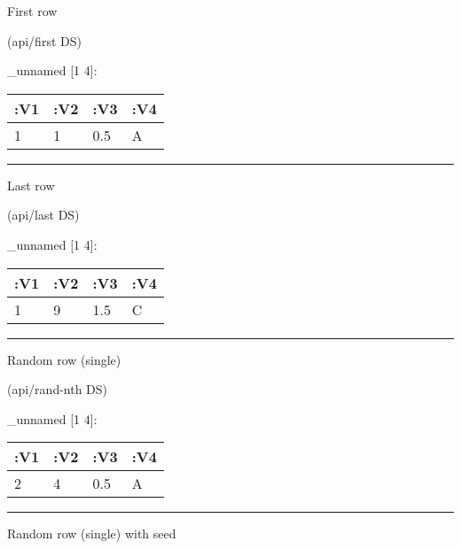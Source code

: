 \documentclass[]{article}
\newenvironment{Shaded}{\begin{snugshade}}{\end{snugshade}}
\newcommand{\NormalTok}[1]{#1}
\begin{document}
First row

\begin{Shaded}
\begin{Highlighting}[]
\NormalTok{(api/first DS)}
\end{Highlighting}
\end{Shaded}

\_unnamed {[}1 4{]}:

\begin{longtable}[]{@{}llll@{}}
\toprule
:V1 & :V2 & :V3 & :V4\tabularnewline
\midrule
\endhead
1 & 1 & 0.5 & A\tabularnewline
\bottomrule
\end{longtable}

\begin{center}\rule{0.5\linewidth}{0.5pt}\end{center}

Last row

\begin{Shaded}
\begin{Highlighting}[]
\NormalTok{(api/last DS)}
\end{Highlighting}
\end{Shaded}

\_unnamed {[}1 4{]}:

\begin{longtable}[]{@{}llll@{}}
\toprule
:V1 & :V2 & :V3 & :V4\tabularnewline
\midrule
\endhead
1 & 9 & 1.5 & C\tabularnewline
\bottomrule
\end{longtable}

\begin{center}\rule{0.5\linewidth}{0.5pt}\end{center}

Random row (single)

\begin{Shaded}
\begin{Highlighting}[]
\NormalTok{(api/rand-nth DS)}
\end{Highlighting}
\end{Shaded}

\_unnamed {[}1 4{]}:

\begin{longtable}[]{@{}llll@{}}
\toprule
:V1 & :V2 & :V3 & :V4\tabularnewline
\midrule
\endhead
2 & 4 & 0.5 & A\tabularnewline
\bottomrule
\end{longtable}

\begin{center}\rule{0.5\linewidth}{0.5pt}\end{center}

Random row (single) with seed
\end{document}
